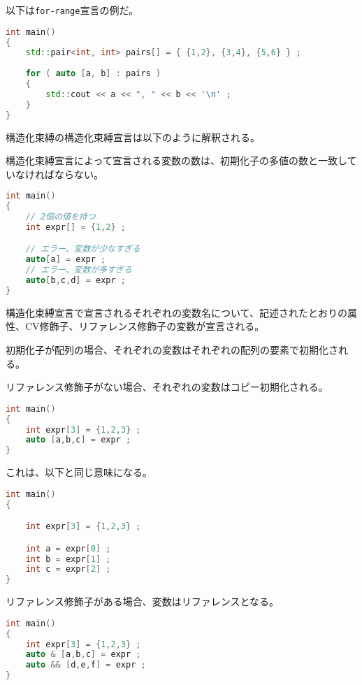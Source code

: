 以下は\lstinline!for-range!宣言の例だ。

\begin{lstlisting}[language=C++]
int main()
{
    std::pair<int, int> pairs[] = { {1,2}, {3,4}, {5,6} } ;
    
    for ( auto [a, b] : pairs )
    {
        std::cout << a << ", " << b << '\n' ;
    }
}
\end{lstlisting}

%

構造化束縛の構造化束縛宣言は以下のように解釈される。

構造化束縛宣言によって宣言される変数の数は、初期化子の多値の数と一致していなければならない。

\begin{lstlisting}[language=C++]
int main()
{
    // 2個の値を持つ
    int expr[] = {1,2} ;

    // エラー、変数が少なすぎる
    auto[a] = expr ; 
    // エラー、変数が多すぎる
    auto[b,c,d] = expr ;
}
\end{lstlisting}

構造化束縛宣言で宣言されるそれぞれの変数名について、記述されたとおりの属性、CV修飾子、リファレンス修飾子の変数が宣言される。

%

初期化子が配列の場合、それぞれの変数はそれぞれの配列の要素で初期化される。

リファレンス修飾子がない場合、それぞれの変数はコピー初期化される。

\begin{lstlisting}[language=C++]
int main()
{
    int expr[3] = {1,2,3} ;
    auto [a,b,c] = expr ;
}
\end{lstlisting}

これは、以下と同じ意味になる。

\begin{lstlisting}[language=C++]
int main()
{

    int expr[3] = {1,2,3} ;

    int a = expr[0] ;
    int b = expr[1] ;
    int c = expr[2] ;
}
\end{lstlisting}

リファレンス修飾子がある場合、変数はリファレンスとなる。

\begin{lstlisting}[language=C++]
int main()
{
    int expr[3] = {1,2,3} ;
    auto & [a,b,c] = expr ;
    auto && [d,e,f] = expr ;
}
\end{lstlisting}

